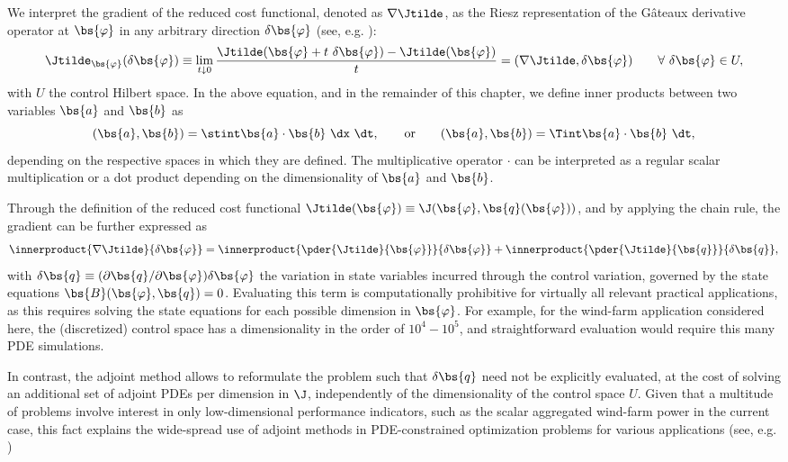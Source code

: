 	We interpret the gradient of the reduced cost functional, denoted as $\nabla \Jtilde$,  as the Riesz representation of the G\^ateaux derivative operator at $\bs{\varphi}$ in any arbitrary direction $\delta \bs{\varphi}$ (see, e.g. \cite{troltzsch}):
	\begin{equation}
		\Jtilde_{\bs{\varphi}}(\delta \bs{\varphi}) \equiv \lim_{t\downarrow0} \frac{\Jtilde(\bs{\varphi}+t\ \delta \bs{\varphi}) - \Jtilde(\bs{\varphi})}{t} = (\nabla \Jtilde, \delta \bs{\varphi}) \qquad \forall \ \delta \bs{\varphi} \in  U,\label{eq:gateauxder}
	\end{equation}
	with $U$ the control Hilbert space. In the above equation, and in the remainder of this chapter, we define inner products between two variables $\bs{a}$ and $\bs{b}$ as 
	\begin{equation*}
		(\bs{a}, \bs{b}) = \stint \bs{a} \cdot \bs{b}\ \dx\ \dt, \qquad \text{or} \qquad 
		(\bs{a}, \bs{b}) = \Tint \bs{a} \cdot \bs{b}\ \dt,
	\end{equation*}
	depending on the respective spaces in which they are defined. The multiplicative operator $\cdot$ can be interpreted as a regular scalar multiplication or a dot product depending on the dimensionality of $\bs{a}$ and $\bs{b}$.

	Through the definition of the reduced cost functional $\Jtilde(\bs{\varphi}) \equiv \J(\bs{\varphi}, \bs{q}(\bs{\varphi}))$, and by applying the chain rule, the gradient can be further expressed as 
	\begin{equation}
		\innerproduct{\nabla \Jtilde}{\delta \bs{\varphi}} = \innerproduct{\pder{\Jtilde}{\bs{\varphi}}}{\delta \bs{\varphi}} + \innerproduct{\pder{\Jtilde}{\bs{q}}}{\delta \bs{q}},
	\end{equation}
	with $\delta \bs{q} \equiv ( \partial \bs{q}/ \partial \bs{\varphi})\delta \bs{\varphi}$ the variation in state variables incurred through the control variation, governed by the state equations $\bs{B}(\bs{\varphi}, \bs{q}) = 0$. 
	Evaluating this term is computationally prohibitive for virtually all relevant practical applications, as this requires solving the state equations for each possible dimension in $\bs{\varphi}$. For example, for the wind-farm application considered here, the (discretized) control space has a dimensionality in the order of $10^4 - 10^5$, and straightforward evaluation would require this many PDE simulations. 

	In contrast, the adjoint method allows to reformulate the problem such that $\delta \bs{q}$ need not be explicitly evaluated, at the cost of solving an additional set of adjoint PDEs per dimension in $\J$, independently of the dimensionality of the control space $U$. Given that a multitude of problems involve interest in  only low-dimensional performance indicators, such as  the scalar aggregated wind-farm power in the current case, this fact explains the wide-spread use of adjoint methods in PDE-constrained optimization problems for various applications (see, e.g. \cite{choi1999instantaneous, aage2008topology, dekeyser2014divertor})
	
